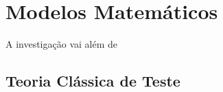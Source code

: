 \documentclass[Tese.tex]{subfiles}
\begin{document}
\chapter{Modelos Matemáticos}
 

A investigação vai além de 

\section{Teoria Clássica de Teste}
\end{document}
